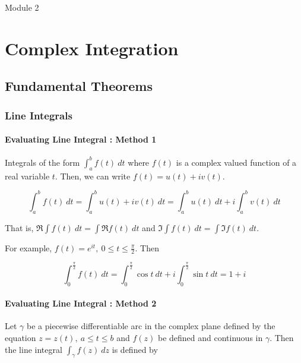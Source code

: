 





{\Large Module 2 }
\section{Complex Integration}
\subsection{Fundamental Theorems}
\subsubsection{Line Integrals}
\paragraph{Evaluating Line Integral : Method 1}
	Integrals of the form $\int_a^b f(t)\ dt$ where $f(t)$ is a complex valued function of a real variable $t$.
	Then, we can write $f(t) = u(t)+iv(t)$.

\[ \int_a^b f(t)\ dt = \int_a^b u(t) + iv(t)\ dt = \int_a^b u(t)\ dt + i\int_a^b v(t)\ dt \]

	That is, $\Re\int f(t)\ dt = \int \Re f(t)\ dt$ and $\Im\int f(t)\ dt = \int \Im f(t)\ dt$.

	For example, $f(t) = e^{it},\ 0 \le t \le \frac{\pi}{2}$.
	Then 

\[ \int_0^{\frac{\pi}{2}} f(t)\ dt = \int_0^{\frac{\pi}{2}} \cos t\ dt + i \int_0^{\frac{\pi}{2}} \sin t\ dt = 1 + i \]

\paragraph{Evaluating Line Integral : Method 2}
	Let $\gamma$ be a piecewise differentiable arc in the complex plane defined by the equation $z = z(t),\ a \le t \le b$ and $f(z)$ be defined and continuous in $\gamma$.
	Then the line integral $\int_\gamma f(z)\ dz$ is defined by

